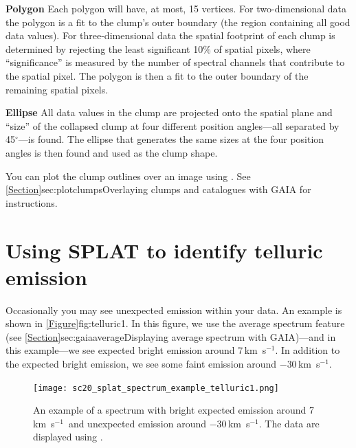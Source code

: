 \documentclass[11pt,oneside,chapters]{starlink}
\newcommand{\kms}{\mbox{$\,$km~s$^{-1}$}}   %
\newcommand{\kms}{\,km~s$^{-1}$}   %
\begin{document}
\begin{aligndesc}
\item[\textbf{Polygon}]
Each polygon will have, at most, 15 vertices. For two-dimensional data
the polygon is a fit to the clump's outer boundary (the region
containing all good data values). For three-dimensional data the
spatial footprint of each clump is determined by rejecting the least
significant 10\% of spatial pixels, where ``significance'' is measured
by the number of spectral channels that contribute to the spatial
pixel. The polygon is then a fit to the outer boundary of the
remaining spatial pixels.
\vspace{0.7cm}\\
\item[\textbf{Ellipse}]
All data values in the clump are projected onto the spatial plane and
``size'' of the collapsed clump at four different position angles---all
separated by 45$^\circ$---is found. The ellipse that generates
the same sizes at the four position angles is then found and used as
the clump shape.
\end{aligndesc}

You can plot the clump outlines over an image using \gaia. See
\cref{Section}{sec:plotclumps}{Overlaying clumps and catalogues with
GAIA} for instructions.


\section{Using SPLAT to identify telluric emission}
\label{sec:telluricsplat}

Occasionally you may see unexpected emission within your data. An
example is shown in \cref{Figure}{fig:telluric1}{}. In this figure, we
use the average spectrum feature (see
\cref{Section}{sec:gaiaaverage}{Displaying average spectrum with
GAIA})---and in this example---we see expected bright emission around
7\kms. In addition to the expected bright emission, we see some faint
emission around $-$30\kms.

\begin{figure}[h!]
\begin{center}
\texttt{[image: sc20\_splat\_spectrum\_example\_telluric1.png]}
\caption[An example of unexpected emission seen in \gaia.]{\label{fig:telluric1}
  An example of a spectrum with bright expected emission around 7\kms\ and
  unexpected emission around $-$30\kms. The data are displayed using \gaia.}
\end{center}
\end{figure}
\end{document}
